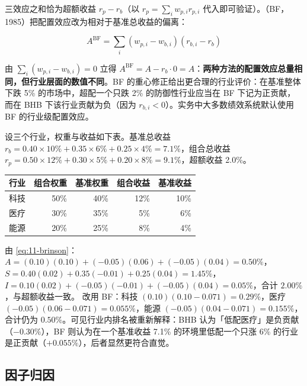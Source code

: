 三效应之和恰为超额收益 $r_p - r_b$（以 $r_p = \sum_i w_{p,i}r_{p,i}$ 代入即可验证）。（BF，1985）把配置效应改为相对于基准总收益的偏离：

\begin{equation}\label{eq:11-brinson-bf}
  A^{\text{BF}} = \sum_{i}\left(w_{p,i} - w_{b,i}\right)\left(r_{b,i} - r_b\right)
\end{equation}

由 $\sum_i(w_{p,i} - w_{b,i}) = 0$ 立得 $A^{\text{BF}} = A - r_b\cdot 0 = A$：\textbf{两种方法的配置效应总量相同，但行业层面的数值不同}。BF 的重心修正给出更合理的行业评价：在基准整体下跌 5\% 的市场中，超配一个只跌 2\% 的防御性行业应当在 BF 下记为正贡献，而在 BHB 下该行业贡献为负（因为 $r_{b,i} < 0$）。实务中大多数绩效系统默认使用 BF 的行业级配置效应。

\begin{example}\label{ex:11-attrib}
设三个行业，权重与收益如下表。基准总收益 $r_b = 0.40\times 10\% + 0.35\times 6\% + 0.25\times 4\% = 7.1\%$，组合总收益 $r_p = 0.50\times 12\% + 0.30\times 5\% + 0.20\times 8\% = 9.1\%$，超额收益 2.0\%。
\begin{center}
\tablefont
\begin{tabular}{@{}lrrrr@{}}
\toprule
行业 & 组合权重 & 基准权重 & 组合收益 & 基准收益 \\
\midrule
科技 & 50\% & 40\% & 12\% & 10\% \\
医疗 & 30\% & 35\% & 5\% & 6\% \\
能源 & 20\% & 25\% & 8\% & 4\% \\
\bottomrule
\end{tabular}
\end{center}
由 \cref{eq:11-brinson}：$A = (0.10)(0.10) + (-0.05)(0.06) + (-0.05)(0.04) = 0.50\%$，$S = 0.40(0.02) + 0.35(-0.01) + 0.25(0.04) = 1.45\%$，$I = 0.10(0.02) + (-0.05)(-0.01) + (-0.05)(0.04) = 0.05\%$，合计 $2.00\%$，与超额收益一致。
改用 BF：科技 $(0.10)(0.10-0.071) = 0.29\%$，医疗 $(-0.05)(0.06-0.071) = 0.055\%$，能源 $(-0.05)(0.04-0.071) = 0.155\%$，合计仍为 $0.50\%$。可见行业内排名被重新解释：BHB 认为「低配医疗」是负贡献（$-0.30\%$），BF 则认为在一个基准收益 7.1\% 的环境里低配一个只涨 6\% 的行业是正贡献（$+0.055\%$），后者显然更符合直觉。
\end{example}

\subsection{因子归因}

